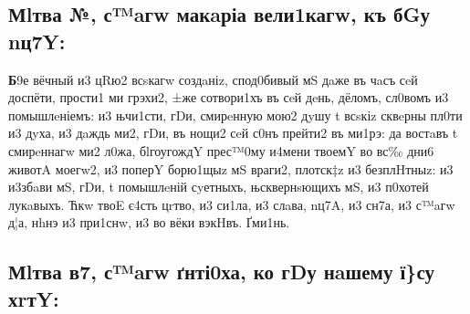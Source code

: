 \subsection{Мlтва №, с™aгw макaріа вели1кагw, къ бGу
    nц7Y:}

\textbf{Б}9е вёчный и3 цRю2 всsкагw создaніz, спод0бивый мS дaже въ чaсъ сeй
доспёти, прости1 ми грэхи2, ±же сотвори1хъ въ сeй дeнь, дёломъ, сл0вомъ
и3 помышлeніемъ: и3 њчи1сти, гDи, смирeнную мою2 дyшу t всsкіz сквeрны
пл0ти и3 дyха, и3 дaждь ми2, гDи, въ нощи2 сeй с0нъ прейти2 въ ми1рэ: да
востaвъ t смирeннагw ми2 л0жа, бlгоугождY прес™0му и4мени твоемY во вс‰
дни6 животA моегw2, и3 поперY борю1щыz мS враги2, плотск‡z и3
безплHтныz: и3 и3збaви мS, гDи, t помышлeній сyетныхъ, њсквернsющихъ мS,
и3 п0хотей лукaвыхъ. Ћкw твоE є4сть цrтво, и3 си1ла, и3 слaва, nц7A, и3
сн7а, и3 с™aгw д¦а, нhнэ и3 при1снw, и3 во вёки вэкHвъ. Ґми1нь.

\subsection{Мlтва в7, с™aгw ґнті0ха, ко гDу нaшему ї\}су хrтY:}


